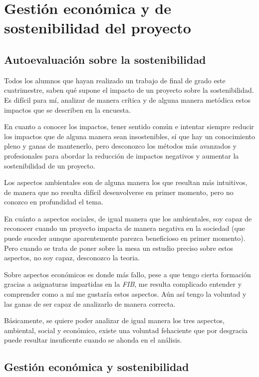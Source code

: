 \chapter{Gestión económica y de sostenibilidad del proyecto}
\label{sec:sostenibilidad}
\section{Autoevaluación sobre la sostenibilidad}

Todos los alumnos que hayan realizado un trabajo de final de grado este cuatrimestre, saben qué supone el impacto de un proyecto sobre la sostenibilidad. Es difícil para mí, analizar de manera crítica y de alguna manera metódica estos impactos que se describen en la encuesta. 
\par\medskip
En cuanto a conocer los impactos, tener sentido común e intentar siempre reducir los impactos que de alguna manera sean insostenibles, sí que hay un conocimiento pleno y ganas de mantenerlo, pero desconozco los métodos más avanzados y profesionales para abordar la reducción de impactos negativos y aumentar la sostenibilidad de un proyecto.
\par\medskip
Los aspectos ambientales son de alguna manera los que resultan más intuitivos, de manera que no resulta difícil desenvolverse en primer momento, pero no conozco en profundidad el tema.
\par\medskip
En cuánto a aspectos sociales, de igual manera que los ambientales, soy capaz de reconocer cuando un proyecto impacta de manera negativa en la sociedad (que puede suceder aunque aparentemente parezca beneficioso en primer momento). Pero cuando se trata de poner sobre la mesa un estudio preciso sobre estos aspectos, no soy capaz, desconozco la teoria.
\par\medskip
Sobre aspectos económicos es donde más fallo, pese a que tengo cierta formación gracias a asignaturas impartidas en la \textit{FIB}, me resulta complicado entender y comprender como a mí me gustaría estos aspectos. Aún así tengo la voluntad y las ganas de ser capaz de analizarlo de manera correcta.
\par\medskip
Básicamente, se quiere poder analizar de igual manera los tres aspectos, ambiental, social y económico, existe una voluntad fehaciente que por desgracia puede resultar insuficente cuando se ahonda en el análisis.

\section{Gestión económica y sostenibilidad}

